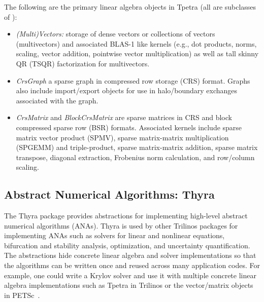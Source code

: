 The following are the primary linear algebra objects in Tpetra (all are subclasses of ):
\begin{itemize}
\item \emph{(Multi)Vectors:} storage of dense vectors or collections of
vectors (multivectors) and associated BLAS-1 like kernels (e.g., dot
products, norms, scaling, vector addition, pointwise vector
multiplication) as well as tall skinny QR (TSQR) factorization for multivectors.
\item \emph{CrsGraph} a sparse graph in compressed row storage (CRS)
format. Graphs also include import/export objects for use in
halo/boundary exchanges associated with the graph.
\item \emph{CrsMatrix} and \emph{BlockCrsMatrix} are sparse matrices in CRS and
block compressed sparse row (BSR) formats. Associated kernels include
sparse matrix vector product (SPMV), sparse matrix-matrix
multiplication (SPGEMM) and triple-product, sparse matrix-matrix addition, sparse matrix transpose, diagonal extraction,
Frobenius norm calculation, and row/column scaling.
\end{itemize}

\subsection{Abstract Numerical Algorithms: Thyra}
The Thyra package provides abstractions for implementing high-level abstract numerical algorithms (ANAs). Thyra is used by other Trilinos packages for implementing ANAs such as solvers for linear and nonlinear equations, bifurcation and stability analysis, optimization, and uncertainty quantification. The abstractions hide concrete linear algebra and solver implementations so that the algorithms can be written once and reused across many application codes. For example, one could write a Krylov solver and use it with multiple concrete linear algebra implementations such as Tpetra in Trilinos %
or the vector/matrix objects in PETSc~\cite{petsc-web-page}.

